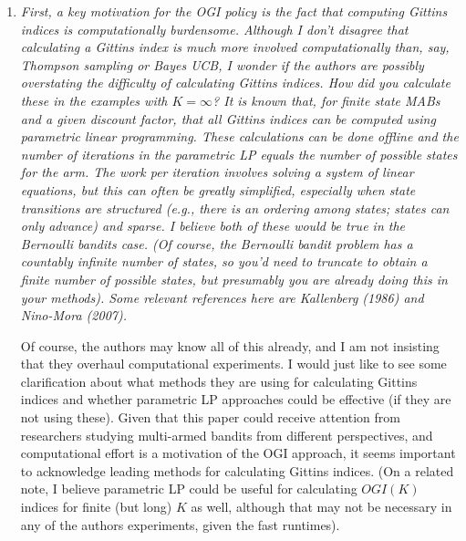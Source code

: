 \documentclass[11pt]{article}
\newcommand{\1}{\ensuremath{\mathbf{1}}} %
\theoremstyle{thm-sf}
\begin{document}
	
	\begin{enumerate}
		
		\item {\it First, a key motivation for the OGI policy is the fact that computing Gittins indices is computationally burdensome. Although I don't disagree that calculating a Gittins index is much more involved computationally than, say, Thompson sampling or Bayes UCB, I wonder if the authors are possibly overstating the difficulty of calculating Gittins indices. How did you calculate these in the examples with $K=\infty$? It is known that, for finite state MABs and a given discount factor, that all Gittins indices can be computed using parametric linear programming. These calculations can be done offline and the number of iterations in the parametric LP equals the number of possible states for the arm. The work per iteration involves solving a system of linear equations, but this can often be greatly simplified, especially when state transitions are structured (e.g., there is an ordering among states; states can only advance) and sparse. I believe both of these would be true in the Bernoulli bandits case. (Of course, the Bernoulli bandit problem has a countably infinite number of states, so you'd need to truncate to obtain a finite number of possible states, but presumably you are already doing this in your methods). Some relevant references here are Kallenberg (1986) and Nino-Mora (2007).
			
		Of course, the authors may know all of this already, and I am not insisting that they overhaul computational experiments. I would just like to see some clarification about what methods they are using for calculating Gittins indices and whether parametric LP approaches could be effective (if they are not using these). Given that this paper could receive attention from researchers studying multi-armed bandits from different perspectives, and computational effort is a motivation of the OGI approach, it seems important to acknowledge leading methods for calculating Gittins indices. (On a related note, I believe parametric LP could be useful for calculating $OGI(K)$ indices for finite (but long) $K$ as well, although that may not be necessary in any of the authors experiments, given the fast runtimes).

		}


\end{enumerate}
\end{document}
